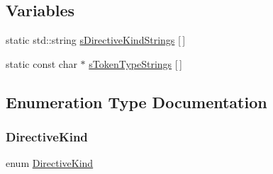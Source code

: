\subsection*{Variables}
\begin{DoxyCompactItemize}
\item 
static std\+::string \hyperlink{namespaceft_a2896a632198d516af93e4aea2d125f59}{s\+Directive\+Kind\+Strings} \mbox{[}$\,$\mbox{]}
\item 
static const char $\ast$ \hyperlink{namespaceft_a1b9b00bc284da71346729142b8560e03}{s\+Token\+Type\+Strings} \mbox{[}$\,$\mbox{]}
\end{DoxyCompactItemize}


\subsection{Enumeration Type Documentation}
\mbox{\label{namespaceft_a5a5554dff10f0dc50bae4cc5825ad75d}} 
\subsubsection{\texorpdfstring{Directive\+Kind}{DirectiveKind}}
{\footnotesize\ttfamily enum \hyperlink{namespaceft_a5a5554dff10f0dc50bae4cc5825ad75d}{Directive\+Kind}}


